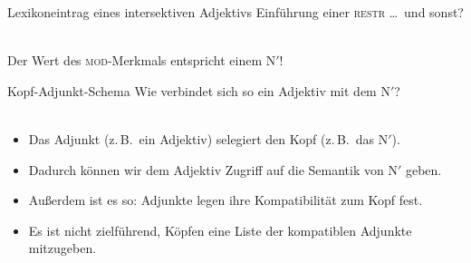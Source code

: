 \begin{frame}
  {Lexikoneintrag eines intersektiven Adjektivs}
  \onslide<+->
  \onslide<+->
  Einführung einer \textsc{restr} \ldots\ und sonst?\\
  \onslide<+->
  \Halbzeile
  \centering 
  \\
  \Halbzeile
  \raggedright
  \alert{Der Wert des \textsc{mod}-Merkmals entspricht einem N$'$!}
\end{frame}

\begin{frame}
  {Kopf-Adjunkt-Schema}
  \onslide<+->
  \onslide<+->
  Wie verbindet sich so ein Adjektiv mit dem N$'$?\\
  \onslide<+->
  \Zeile
  \centering 
   \\
  \Zeile
  \begin{itemize}[<+->]
    \item Das \alert{Adjunkt (z.\,B.\ ein Adjektiv) selegiert den Kopf (z.\,B.\ das N$'$)}.
    \item Dadurch können wir dem Adjektiv Zugriff auf die Semantik von N$'$ geben.
    \item Außerdem ist es so: Adjunkte legen ihre Kompatibilität zum Kopf fest.
    \item Es ist nicht zielführend, Köpfen eine Liste der kompatiblen Adjunkte mitzugeben.
  \end{itemize}
\end{frame}

